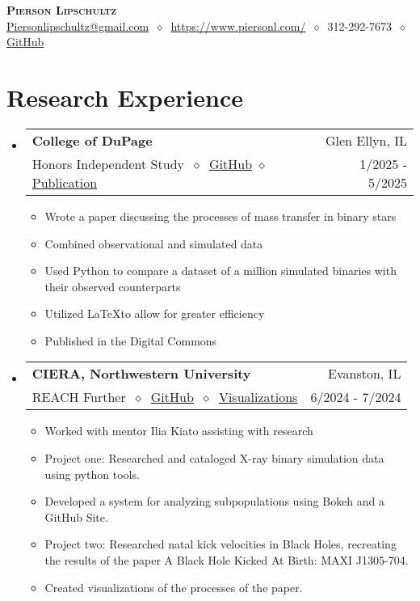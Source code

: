 \documentclass[letterpaper,11pt]{article}
\makeatletter
\newcommand{\cvitem}[1]{
  \item\small{
    {#1\vspace{-2pt}}
  }
}
\newcommand{\cvheading}[4]{
  \vspace{-2pt}\item
    \begin{tabular*}{\textwidth}[t]{l@{\extracolsep{\fill}}r}
      \textbf{#1} & #2 \\
      \small#3 & \small #4 \\
    \end{tabular*}\vspace{-7pt}
}
\newcommand{\cvheadingstart}{\begin{itemize}[leftmargin=0in, label={}]}
\newcommand{\cvheadingend}{\end{itemize}}
\newcommand{\cvitemstart}{\begin{itemize}[label=\textopenbullet]\justifying}
\newcommand{\cvitemend}{\end{itemize}\vspace{-5pt}}
\makeatother
\begin{document}
\begin{center}
  \textbf{\LARGE\scshape Pierson Lipschultz} \\
  \vspace{1pt}\small
  \href{mailto:}{Piersonlipschultz@gmail.com}
  $\ \diamond\ $
  \href{https://www.piersonl.com/}{https://www.piersonl.com/}
  $\ \diamond\ $ 
  312-292-7673
  $\ \diamond\ $
  \href{https://github.com/PiersonLip}{GitHub}
\end{center}

\section{Research Experience}
\cvheadingstart
  \cvheading
    {College of DuPage}{Glen Ellyn, IL}
    {Honors Independent Study $\ \diamond\ $ \href{https://github.com/PiersonLip/Honors-Independent-Study}{GitHub} $\diamond$ \href{https://dc.cod.edu/srs/2025/schedule/25/}{Publication}}{1/2025 - 5/2025}
  \cvitemstart
    \cvitem{Wrote a paper discussing the processes of mass transfer in binary stars}
    \cvitem{Combined observational and simulated data}
    \cvitem{Used Python to compare a dataset of a million simulated binaries with their observed counterparts}
    \cvitem{Utilized \LaTeX to allow for greater efficiency}
    \cvitem{Published in the Digital Commons}
  \cvitemend

  \cvheading
    {CIERA, Northwestern University}{Evanston, IL}
    {REACH Further $\ \diamond\ $ \href{https://piersonlip.github.io/XB/}{GitHub} $\ \diamond\ $ \href{https://youtube.com/playlist?list=PLq73rWo79HTuEUPYdUz11PpY6DLhuF9Wl\&si=VjHikj-V-IePgofn}{Visualizations}}{6/2024 - 7/2024}

  \cvitemstart
    \cvitem{Worked with mentor Ilia Kiato assisting with research}
    \cvitem{Project one: Researched and cataloged X-ray binary simulation data using python tools.}
    \cvitem{Developed a system for analyzing subpopulations using Bokeh and a GitHub Site.}
    \cvitem{Project two: Researched natal kick velocities in Black Holes, recreating the results of the paper A Black Hole Kicked At Birth: MAXI J1305-704.}
    \cvitem{Created visualizations of the processes of the paper.}
  \cvitemend


\cvheadingend
\end{document}
